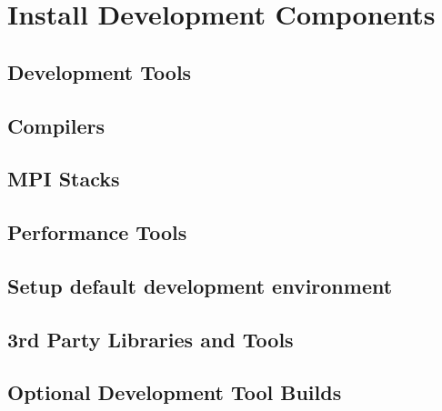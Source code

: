\documentclass[letterpaper]{article}
\begin{document}
\clearpage
\section{Install \OHPC{} Development Components}


\subsection{Development Tools} \label{sec:install_dev_tools}


\vspace*{-0.15cm}
\subsection{Compilers} \label{sec:install_compilers}


\subsection{MPI Stacks} \label{sec:mpi}


\subsection{Performance Tools} \label{sec:install_perf_tools}


\subsection{Setup default development environment}


\subsection{3rd Party Libraries and Tools} \label{sec:3rdparty}



\vspace*{0.1cm}

\vspace*{0.5cm}
\subsection{Optional Development Tool Builds} \label{sec:3rdparty_intel}

\end{document}
